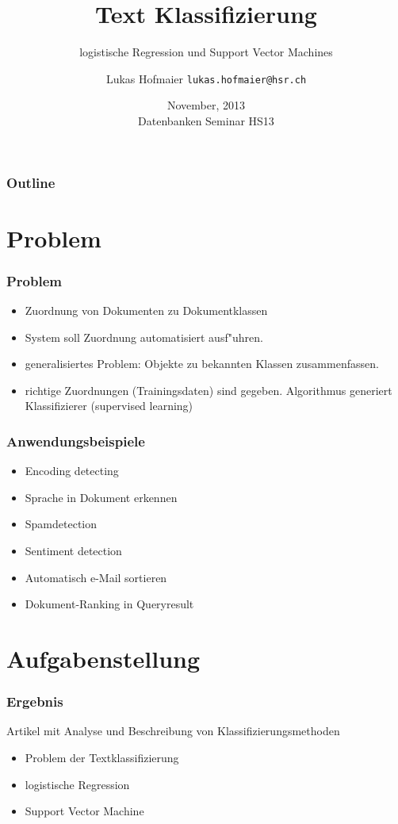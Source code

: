 \documentclass{beamer}
\title{Text Klassifizierung}
\subtitle{logistische Regression und Support Vector Machines}
\author{Lukas Hofmaier \texttt{lukas.hofmaier@hsr.ch}}
\date{November, 2013 \\ Datenbanken Seminar HS13}
\begin{document}
\maketitle
\begin{frame}
  \frametitle{Outline}
  \tableofcontents
\end{frame}

\section{Problem}
\label{sec:problem}

\begin{frame}
  \frametitle{Problem}
  \begin{itemize}
  \item Zuordnung von Dokumenten zu Dokumentklassen
  \item System soll Zuordnung automatisiert ausf"uhren.
  \item generalisiertes Problem: Objekte zu bekannten Klassen zusammenfassen.
    \item richtige Zuordnungen (Trainingsdaten) sind gegeben. Algorithmus generiert Klassifizierer (supervised learning)
  \end{itemize}

\end{frame}

\begin{frame}
  \frametitle{Anwendungsbeispiele}
\begin{itemize}
\item Encoding detecting
\item Sprache in Dokument erkennen
\item Spamdetection
\item Sentiment detection
\item Automatisch e-Mail sortieren
\item Dokument-Ranking in Queryresult
\end{itemize}



\end{frame}

\section{Aufgabenstellung}
\begin{frame}
  \frametitle{Ergebnis}
  Artikel mit Analyse und Beschreibung von Klassifizierungsmethoden
  \begin{itemize}
  \item Problem der Textklassifizierung
  \item logistische Regression
  \item Support Vector Machine
  \end{itemize}
\end{frame}
\end{document}
